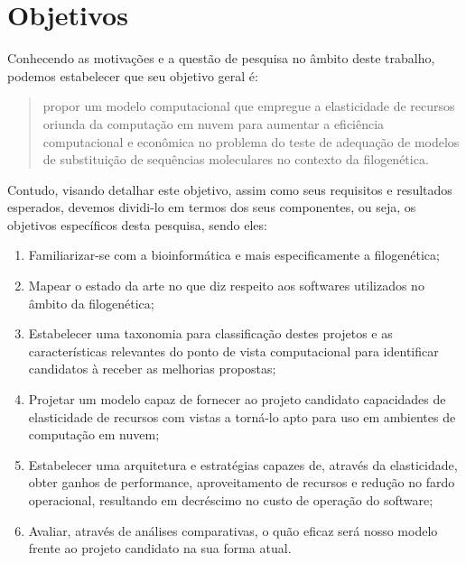 \documentclass[english,brazilian]{UNISINOSmonografia} %
\begin{document}
\section{Objetivos}
\label{sec:objetivos}



Conhecendo as motivações e a questão de pesquisa no âmbito deste trabalho, podemos estabelecer que seu objetivo geral é:
\begin{quote}
	\large
	propor um modelo computacional que empregue a elasticidade de recursos oriunda da computação em nuvem para aumentar a eficiência computacional e econômica no problema do teste de adequação de modelos de substituição de sequências moleculares no contexto da filogenética.
\end{quote}
Contudo, visando detalhar este objetivo, assim como seus requisitos e resultados esperados, devemos dividi-lo em termos dos seus componentes, ou seja, os objetivos específicos desta pesquisa, sendo eles:


\begin{enumerate}[label=Objetivo~\arabic*:~,itemindent=*]
	
	\item Familiarizar-se com a bioinformática e mais especificamente a filogenética;
	
	\item Mapear o estado da arte no que diz respeito aos softwares utilizados no âmbito da filogenética;
	
	\item Estabelecer uma taxonomia para classificação destes projetos e as características relevantes do ponto de vista computacional para identificar candidatos à receber as melhorias propostas;
	
	\item Projetar um modelo capaz de fornecer ao projeto candidato capacidades de elasticidade de recursos com vistas a torná-lo apto para uso em ambientes de computação em nuvem;
	
	\item Estabelecer uma arquitetura e estratégias capazes de, através da elasticidade, obter ganhos de performance, aproveitamento de recursos e redução no fardo operacional, resultando em decréscimo no custo de operação do software;
	
	\item Avaliar, através de análises comparativas, o quão eficaz será nosso modelo frente ao projeto candidato na sua forma atual.
	
\end{enumerate}
\end{document}
